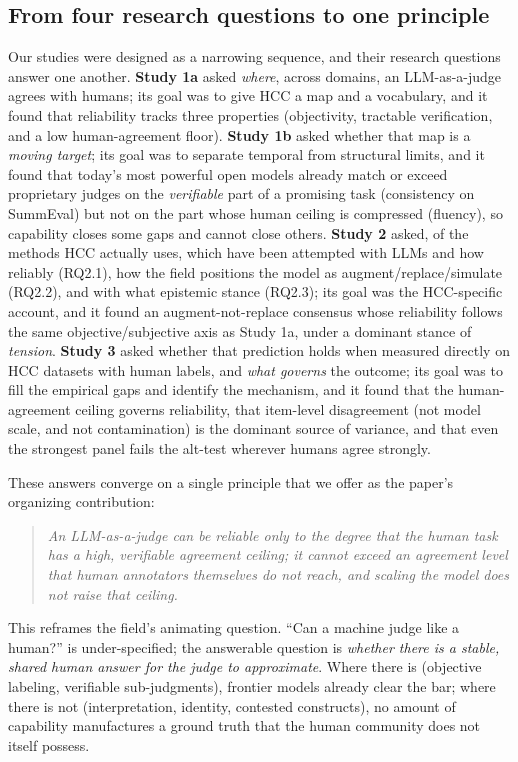 \subsection{From four research questions to one principle}
Our studies were designed as a narrowing sequence, and their research questions answer one another.
\textbf{Study 1a} asked \emph{where}, across domains, an LLM-as-a-judge agrees with humans; its goal was to give HCC
a map and a vocabulary, and it found that reliability tracks three properties (objectivity, tractable verification,
and a low human-agreement floor). \textbf{Study 1b} asked whether that map is a \emph{moving target}; its goal was
to separate temporal from structural limits, and it found that today's most powerful open models already match or
exceed proprietary judges on the \emph{verifiable} part of a promising task (consistency on SummEval) but not on the
part whose human ceiling is compressed (fluency), so capability closes some gaps and cannot close others.
\textbf{Study 2} asked, of the methods HCC actually uses, which have been attempted with LLMs and how reliably
(RQ2.1), how the field positions the model as augment/replace/simulate (RQ2.2), and with what epistemic stance
(RQ2.3); its goal was the HCC-specific account, and it found an augment-not-replace consensus whose reliability
follows the same objective/subjective axis as Study 1a, under a dominant stance of \emph{tension}. \textbf{Study 3}
asked whether that prediction holds when measured directly on HCC datasets with human labels, and \emph{what governs}
the outcome; its goal was to fill the empirical gaps and identify the mechanism, and it found that the
human-agreement ceiling governs reliability, that item-level disagreement (not model scale, and not contamination)
is the dominant source of variance, and that even the strongest panel fails the alt-test wherever humans agree
strongly.

These answers converge on a single principle that we offer as the paper's organizing contribution:
\begin{quote}\itshape
An LLM-as-a-judge can be reliable only to the degree that the human task has a high, verifiable agreement ceiling;
it cannot exceed an agreement level that human annotators themselves do not reach, and scaling the model does not
raise that ceiling.
\end{quote}
This reframes the field's animating question. ``Can a machine judge like a human?'' is under-specified; the
answerable question is \emph{whether there is a stable, shared human answer for the judge to approximate}. Where
there is (objective labeling, verifiable sub-judgments), frontier models already clear the bar; where there is not
(interpretation, identity, contested constructs), no amount of capability manufactures a ground truth that the human
community does not itself possess.

